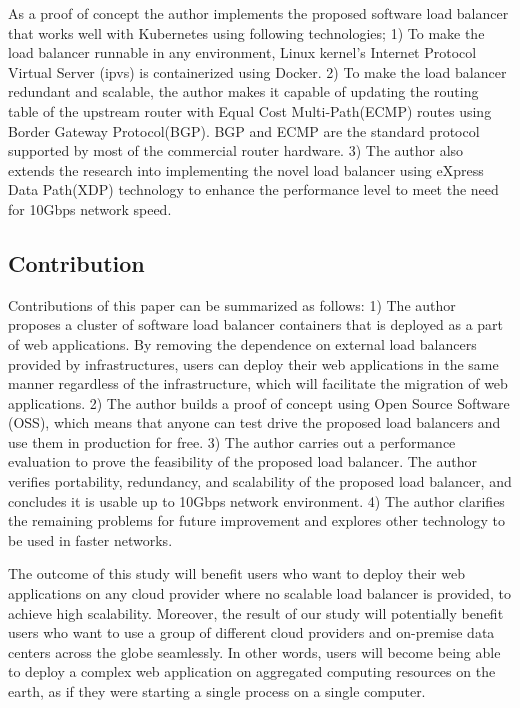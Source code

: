 As a proof of concept the author implements the proposed software load balancer that works well with Kubernetes using following technologies;
1) To make the load balancer runnable in any environment, Linux kernel's Internet Protocol Virtual Server (ipvs)\cite{Zhang2000} is containerized using Docker\cite{merkel2014docker}. 
2) To make the load balancer redundant and scalable, the author makes it capable of updating the routing table of the upstream router with Equal Cost Multi-Path(ECMP) routes\cite{al2008scalable} using Border Gateway Protocol(BGP).
BGP and ECMP are the standard protocol supported by most of the commercial router hardware.
3) The author also extends the research into implementing the novel load balancer using eXpress Data Path(XDP) technology\cite{bertin2017xdp} to enhance the performance level to meet the need for 10Gbps network speed.

\subsection{Contribution}


Contributions of this paper can be summarized as follows:
1) The author proposes a cluster of software load balancer containers that is deployed as a part of web applications.
By removing the dependence on external load balancers provided by infrastructures, users can deploy their web applications in the same manner regardless of the infrastructure, which will facilitate the migration of web applications.
2) The author builds a proof of concept using Open Source Software (OSS), which means that anyone can test drive the proposed load balancers and use them in production for free.
3) The author carries out a performance evaluation to prove the feasibility of the proposed load balancer.
The author verifies portability, redundancy, and scalability of the proposed load balancer, and concludes it is usable up to 10Gbps network environment.
4) The author clarifies the remaining problems for future improvement and explores other technology to be used in faster networks.

The outcome of this study will benefit users who want to deploy their web applications on any cloud provider where no scalable load balancer is provided, to achieve high scalability.
Moreover, the result of our study will potentially benefit users who want to use a group of different cloud providers and on-premise data centers across the globe seamlessly.
In other words, users will become being able to deploy a complex web application on aggregated computing resources on the earth, as if they were starting a single process on a single computer.

